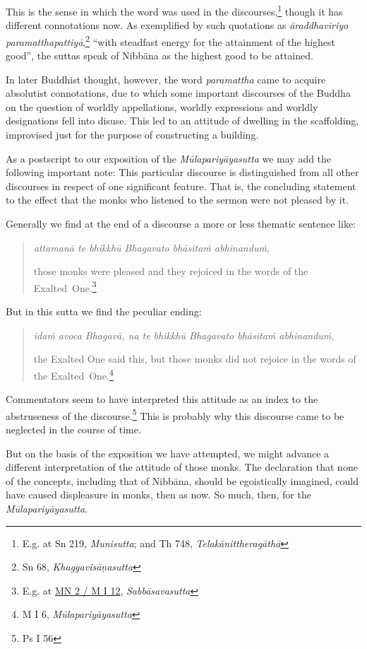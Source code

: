 This is the sense in which the word was used in the discourses,\footnote{E.g. at Sn 219, \emph{Munisutta}; and Th 748, \emph{Telakānittheragāthā}} though it has different connotations now. As exemplified by such quotations as \emph{āraddhaviriyo paramatthapattiyā},\footnote{Sn 68, \emph{Khaggavisāṇasutta}} ``with steadfast energy for the attainment of the highest good'', the suttas speak of Nibbāna as the highest good to be attained.

In later Buddhist thought, however, the word \emph{paramattha} came to acquire absolutist connotations, due to which some important discourses of the Buddha on the question of worldly appellations, worldly expressions and worldly designations fell into disuse. This led to an attitude of dwelling in the scaffolding, improvised just for the purpose of constructing a building.

As a postscript to our exposition of the \emph{Mūlapariyāyasutta} we may add the following important note: This particular discourse is distinguished from all other discourses in respect of one significant feature. That is, the concluding statement to the effect that the monks who listened to the sermon were not pleased by it.

Generally we find at the end of a discourse a more or less thematic sentence like:

\begin{quote}
\emph{attamanā te bhikkhū Bhagavato bhāsitaṁ abhinanduṁ,}

those monks were pleased and they rejoiced in the words of the Exalted~One.\footnote{E.g. at \href{https://suttacentral.net/mn2/pli/ms}{MN 2 / M I 12}, \emph{Sabbāsavasutta}}
\end{quote}

But in this sutta we find the peculiar ending:

\begin{quote}
\emph{idaṁ avoca Bhagavā, na te bhikkhū Bhagavato bhāsitaṁ abhinanduṁ,}

the Exalted One said this, but those monks did not rejoice in the words of the Exalted~One.\footnote{M I 6, \emph{Mūlapariyāyasutta}}
\end{quote}

Commentators seem to have interpreted this attitude as an index to the abstruseness of the discourse.\footnote{Ps I 56} This is probably why this discourse came to be neglected in the course of time.

But on the basis of the exposition we have attempted, we might advance a different interpretation of the attitude of those monks. The declaration that none of the concepts, including that of Nibbāna, should be egoistically imagined, could have caused displeasure in monks, then as now. So much, then, for the \emph{Mūlapariyāyasutta}.

